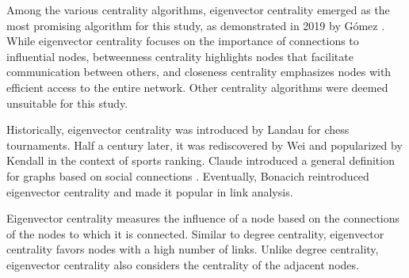 Among the various centrality algorithms, eigenvector centrality emerged as the most promising algorithm for this study, as demonstrated in 2019 by Gómez \cite{Gomez2019}.
While eigenvector centrality focuses on the importance of connections to influential nodes, betweenness centrality highlights nodes that facilitate communication between others, and closeness centrality emphasizes nodes with efficient access to the entire network.
Other centrality algorithms were deemed unsuitable for this study.


Historically, eigenvector centrality was introduced by Landau \cite{landau1895relativen} for chess tournaments.
Half a century later, it was rediscovered by Wei \cite{wei1952algebraic} and popularized by Kendall \cite{760e07d1-fd0d-3ce0-afae-f7ab9cd57766} in the context of sports ranking.
Claude introduced a general definition for graphs based on social connections \cite{claude1966theorie}.
Eventually, Bonacich \cite{35397813-90c1-3806-8d5d-a07b3340ac3d} reintroduced eigenvector centrality and made it popular in link analysis.


Eigenvector centrality measures the influence of a node based on the connections of the nodes to which it is connected.
Similar to degree centrality, eigenvector centrality favors nodes with a high number of links.
Unlike degree centrality, eigenvector centrality also considers the centrality of the adjacent nodes.

